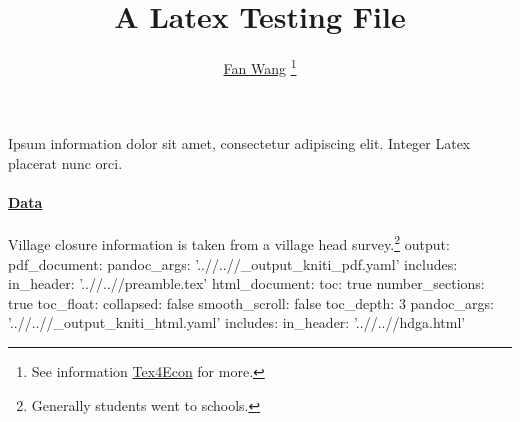 \documentclass[12pt,english]{article}
\begin{document}
\title{A Latex Testing File}
\author{\href{http://fanwangecon.github.io/}{Fan Wang} \thanks{See information \href{https://fanwangecon.github.io/Tex4Econ/}{Tex4Econ} for more.}}
\maketitle
Ipsum information dolor sit amet, consectetur adipiscing elit. Integer Latex placerat nunc orci.
\paragraph{\href{https://papers.ssrn.com/sol3/papers.cfm?abstract_id=3140132}{Data}}
Village closure information is taken from a village head survey.\footnote{Generally students went to schools.}
output:
  pdf_document:
    pandoc_args: '..//..//_output_kniti_pdf.yaml'
    includes:
      in_header: '..//..//preamble.tex'
  html_document:
    toc: true
    number_sections: true
    toc_float:
      collapsed: false
      smooth_scroll: false
      toc_depth: 3
    pandoc_args: '..//..//_output_kniti_html.yaml'
    includes:
      in_header: '..//..//hdga.html'
\end{document}
